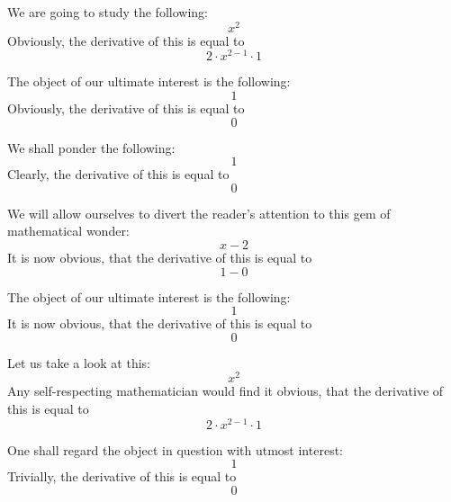 \documentclass{article}
\begin{document}
We are going to study the following:
\begin{equation}
x ^{2 } 
\end{equation}
Obviously, the derivative of this is equal to
\begin{equation}
2 \cdot x ^{2 - 1 } \cdot 1 
\end{equation}

The object of our ultimate interest is the following:
\begin{equation}
1 
\end{equation}
Obviously, the derivative of this is equal to
\begin{equation}
0 
\end{equation}

We shall ponder the following:
\begin{equation}
1 
\end{equation}
Clearly, the derivative of this is equal to
\begin{equation}
0 
\end{equation}

We will allow ourselves to divert the reader's attention to this gem of mathematical wonder:
\begin{equation}
x - 2 
\end{equation}
It is now obvious, that the derivative of this is equal to
\begin{equation}
1 - 0 
\end{equation}

The object of our ultimate interest is the following:
\begin{equation}
1 
\end{equation}
It is now obvious, that the derivative of this is equal to
\begin{equation}
0 
\end{equation}

Let us take a look at this:
\begin{equation}
x ^{2 } 
\end{equation}
Any self-respecting mathematician would find it obvious, that the derivative of this is equal to
\begin{equation}
2 \cdot x ^{2 - 1 } \cdot 1 
\end{equation}

One shall regard the object in question with utmost interest:
\begin{equation}
1 
\end{equation}
Trivially, the derivative of this is equal to
\begin{equation}
0 
\end{equation}
\end{document}
